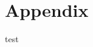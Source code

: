 \documentclass[3p]{elsarticle}
\begin{document}
\section{Appendix}
test \cite{einstein}


\end{document}

